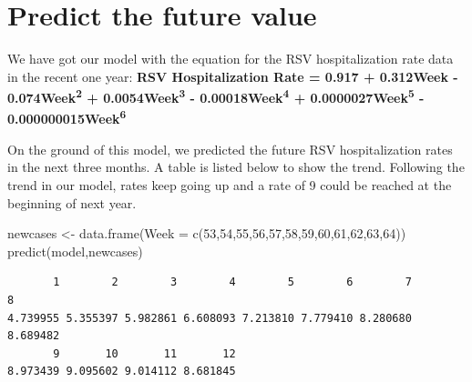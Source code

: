\documentclass[
  letterpaper,
  DIV=11,
  numbers=noendperiod]{scrreport}
\newenvironment{Shaded}{\begin{snugshade}}{\end{snugshade}}
\newcommand{\AttributeTok}[1]{\textcolor[rgb]{0.40,0.45,0.13}{#1}}
\newcommand{\DecValTok}[1]{\textcolor[rgb]{0.68,0.00,0.00}{#1}}
\newcommand{\FunctionTok}[1]{\textcolor[rgb]{0.28,0.35,0.67}{#1}}
\newcommand{\NormalTok}[1]{\textcolor[rgb]{0.00,0.23,0.31}{#1}}
\newcommand{\OtherTok}[1]{\textcolor[rgb]{0.00,0.23,0.31}{#1}}
\begin{document}
\hypertarget{predict-the-future-value}{%
\section{Predict the future value}\label{predict-the-future-value}}

We have got our model with the equation for the RSV hospitalization rate
data in the recent one year: \textbf{RSV Hospitalization Rate = 0.917 +
0.312Week - 0.074Week\textsuperscript{2} + 0.0054Week\textsuperscript{3}
- 0.00018Week\textsuperscript{4} + 0.0000027Week\textsuperscript{5} -
0.000000015Week\textsuperscript{6}}

On the ground of this model, we predicted the future RSV hospitalization
rates in the next three months. A table is listed below to show the
trend. Following the trend in our model, rates keep going up and a rate
of 9 could be reached at the beginning of next year.

\begin{Shaded}
\begin{Highlighting}[]
\NormalTok{newcases }\OtherTok{\textless{}{-}} \FunctionTok{data.frame}\NormalTok{(}\AttributeTok{Week =} \FunctionTok{c}\NormalTok{(}\DecValTok{53}\NormalTok{,}\DecValTok{54}\NormalTok{,}\DecValTok{55}\NormalTok{,}\DecValTok{56}\NormalTok{,}\DecValTok{57}\NormalTok{,}\DecValTok{58}\NormalTok{,}\DecValTok{59}\NormalTok{,}\DecValTok{60}\NormalTok{,}\DecValTok{61}\NormalTok{,}\DecValTok{62}\NormalTok{,}\DecValTok{63}\NormalTok{,}\DecValTok{64}\NormalTok{))}
\FunctionTok{predict}\NormalTok{(model,newcases)}
\end{Highlighting}
\end{Shaded}

\begin{verbatim}
       1        2        3        4        5        6        7        8 
4.739955 5.355397 5.982861 6.608093 7.213810 7.779410 8.280680 8.689482 
       9       10       11       12 
8.973439 9.095602 9.014112 8.681845 
\end{verbatim}
\end{document}
